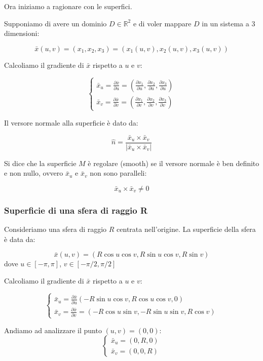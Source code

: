Ora iniziamo a ragionare con le superfici.

Supponiamo di avere un dominio $D \in \mathbb{R}^2$ e di voler mappare $D$ in un sistema a 3 dimensioni:

$$
\bar{x}(u,v) = (x_1, x_2, x_3) = (x_1(u,v), x_2(u,v), x_3(u,v))
$$

Calcoliamo il gradiente di $\bar{x}$ rispetto a $u$ e $v$:

$$
\begin{cases}
\bar x_u = \frac{\partial \bar x}{\partial u} = \left( \frac{\partial x_1}{\partial u}, \frac{\partial x_2}{\partial u}, \frac{\partial x_3}{\partial u} \right)
\\
\bar x_v =\frac{\partial \bar x}{\partial v} = \left( \frac{\partial x_1}{\partial v}, \frac{\partial x_2}{\partial v}, \frac{\partial x_3}{\partial v} \right)
\end{cases}
$$

Il versore normale alla superficie è dato da:

$$
\hat {n} = \dfrac{\bar x_u \times \bar x_v}{|\bar x_u \times \bar x_v|}
$$

Si dice che la superficie $M$ è regolare (smooth) se il versore normale è ben definito e non nullo, ovvero $\bar x_u$ e $\bar x_v$ non sono paralleli:

$$
\bar x_u \times \bar x_v \neq 0
$$

\subsubsection{Superficie di una sfera di raggio R}

Consideriamo una sfera di raggio $R$ centrata nell'origine. La superficie della sfera è data da:

$$
\bar x(u,v) = (R \cos u \cos v, R \sin u \cos v, R \sin v)
$$
dove $u \in [-\pi, \pi]$, $v \in [-\pi/2, \pi/2]$

\vspace{0.5em}

Calcoliamo il gradiente di $\bar x$ rispetto a $u$ e $v$:

$$
\begin{cases}
\bar x_u = \frac{\partial \bar x}{\partial u} (-R \sin u \cos v, R \cos u \cos v, 0)
\\
\bar x_v = \frac{\partial \bar x}{\partial v} = (-R \cos u \sin v, -R \sin u \sin v, R \cos v)
\end{cases}
$$

Andiamo ad analizzare il punto $(u,v) = (0,0)$:
$$
\begin{cases}
\bar x_u = (0, R, 0)
\\
\bar x_v = (0, 0, R)
\end{cases}
$$

